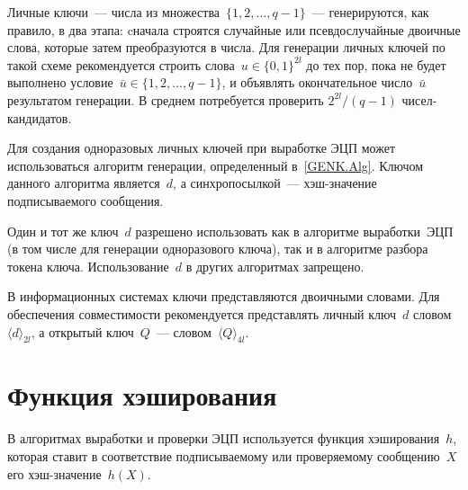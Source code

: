 \begin{note*}
Личные ключи~--- числа из множества~$\{1,2,\ldots,q-1\}$~--- 
генерируются, как правило, в два этапа: cначала строятся случайные 
или псевдослучайные двоичные слова, которые затем преобразуются в числа. 
Для генерации личных ключей по такой схеме 
рекомендуется строить слова~$u\in\{0,1\}^{2l}$ до тех пор, 
пока не будет выполнено условие~$\bar{u}\in\{1,2,\ldots,q-1\}$,
и объявлять окончательное число~$\bar{u}$ результатом генерации.
В среднем потребуется проверить $2^{2l}/(q-1)$ чисел-кандидатов.
\end{note*}

%                                     

Для создания одноразовых личных ключей при выработке ЭЦП 
может использоваться алгоритм генерации, 
определенный в~\ref{GENK.Alg}.
%
Ключом данного алгоритма является~$d$,
а синхропосылкой~--- хэш-значение подписываемого сообщения.
  

Один и тот же ключ~$d$ разрешено использовать как в алгоритме выработки~ЭЦП 
(в том числе для генерации одноразового ключа), 
так и в алгоритме разбора токена ключа.
Использование~$d$ в других алгоритмах запрещено.

В информационных системах ключи представляются двоичными словами.
Для обеспечения совместимости рекомендуется представлять
личный ключ~$d$ словом~$\langle d\rangle_{2l}$,
а открытый ключ~$Q$~--- словом~$\langle Q\rangle_{4l}$.

\section{Функция хэширования}\label{COMMON.Hash}

В алгоритмах выработки и проверки ЭЦП используется функция 
хэширования~$h$, которая ставит в соответствие подписываемому или 
проверяемому сообщению~$X$ его хэш-значение~$h(X)$.
%

